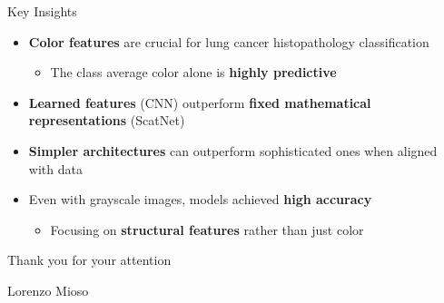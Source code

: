 \documentclass[aspectratio=169,8pt]{beamer}  %
\begin{document}
\begin{frame}{Key Insights}
\begin{itemize}
\item \textbf{Color features} are crucial for lung cancer histopathology classification
  \begin{itemize}
  \item The class average color alone is \textbf{highly predictive}
  \end{itemize}
\item \textbf{Learned features} (CNN) outperform \textbf{fixed mathematical representations} (ScatNet)
\item \textbf{Simpler architectures} can outperform sophisticated ones when aligned with data
\item Even with grayscale images, models achieved \textbf{high accuracy}
  \begin{itemize}
  \item Focusing on \textbf{structural features} rather than just color
  \end{itemize}
\end{itemize}
\end{frame}

\begin{frame}[plain]
\centering
\vspace{2cm}
{\Large Thank you for your attention}

\vspace{1cm}
{\large Lorenzo Mioso}
\end{frame}
\end{document}
